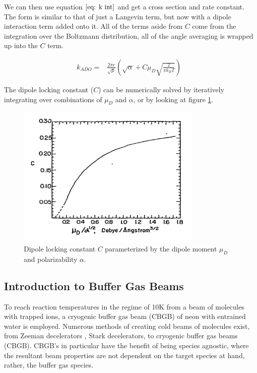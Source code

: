 \documentclass[a4paper]{article}
\begin{document}
We can then use equation $\ref{eq: k int}$ and get a cross section and rate constant. The form is similar to that of just a Langevin term, but now with a dipole interaction term added onto it. All of the terms aside from $C$ come from the integration over the Boltzmann distribution, all of the angle averaging is wrapped up into the $C$ term.

\begin{align}
    k_{ADO} = & \frac{2 \pi e}{\sqrt{\mu}}\left(\sqrt{\alpha}+C \mu_D\sqrt{\frac{2}{\pi k_B T}}\right)
\end{align}

The dipole locking constant ($C$) can be numerically solved by iteratively integrating over combinations of $\mu_D$ and $\alpha$, or by looking at figure \ref{fig: C}.\cite{Su1973}\cite{Troe1985}

\begin{figure}[H]
\label{fig: C}
\centering
\includegraphics[width=0.8\textwidth]{ADO_C.pdf}
\caption{Dipole locking constant $C$ parameterized by the dipole moment $\mu_D$ and polarizability $\alpha$.\cite{Su1973}}
\end{figure}

\subsection{Introduction to Buffer Gas Beams}

To reach reaction temperatures in the regime of 10K from a beam of molecules with trapped ions, a cryogenic buffer gas beam (CBGB) of neon with entrained water is employed. Numerous methods of creating cold beams of molecules exist, from Zeeman decelerators \cite{Narevicius2008}, Stark decelerators, to cryogenic buffer gas beams (CBGB). CBGB's in particular have the benefit of being species agnostic, where the resultant beam properties are not dependent on the target species at hand, rather, the buffer gas species. 
\end{document}
